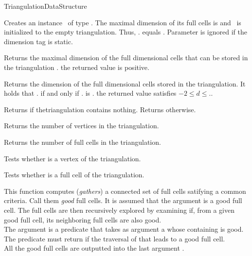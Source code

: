 \begin{ccRefConcept}{TriangulationDataStructure}
\ccGlue
{}

\ccCreation
{}

 {Creates an instance \ccVar\ of
type \ccRefName. The maximal dimension of its full cells is  and
\ccVar\ is initialized to the empty triangulation. Thus,
\ccVar. equals .
Parameter  is ignored if the dimension tag is static.}



 { Returns the maximal dimension of
the full dimensional cells that can be stored in the triangulation \ccVar. \ccPostcond the
returned value is positive. }

 { Returns the dimension of the
full dimensional cells stored in the triangulation. It holds that
\ccVar. if and only if \ccVar. is
. \ccPostcond the returned value  satisfies 
$-2\leq d \leq$\ccVar.. }

 { Returns  if thetriangulation
contains nothing. Returns  otherwise. }

{Returns the number of vertices in the triangulation.}

{Returns the number of full cells  in the triangulation.}

{Tests whether  is a vertex of the triangulation. }

{Tests whether  is a full cell of the triangulation.}

{This function computes (\emph{gathers}) a connected set of full cells
satifying a common criteria. Call them \emph{good} full cells. It is assumed
that the argument  is a good full cell. The full cells are then
recursively explored by examining if, from a given good full cell, its neighboring
full cells are also good.\\
The argument  is a predicate that takes as argument a 
whose containing  is good. The predicate must return 
if the traversal of that  leads to a good full cell.\\
All the good full cells are outputted into the last argument .}


\end{ccRefConcept}

